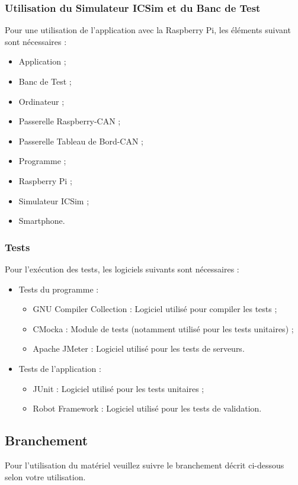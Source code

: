 \subsubsection{Utilisation du Simulateur ICSim et du Banc de Test}
Pour une utilisation de l'application {\nomApplication} avec la Raspberry Pi, les éléments suivant sont nécessaires :
\begin{itemize}
    \item Application {\nomApplication} ;
    \item Banc de Test ;
    \item Ordinateur ;
    \item Passerelle Raspberry-CAN ;
    \item Passerelle Tableau de Bord-CAN ;
    \item Programme {\nomLogiciel} ;
    \item Raspberry Pi ;
    \item Simulateur ICSim ;
    \item Smartphone.
\end{itemize}

\subsubsection{Tests}
Pour l'exécution des tests, les logiciels suivants sont nécessaires :
\begin{itemize}
    \item Tests du programme {\nomLogiciel} :
    \begin{itemize}
        \item GNU Compiler Collection : Logiciel utilisé pour compiler les tests ;
        \item CMocka : Module de tests (notamment utilisé pour les tests unitaires) ;
        \item Apache JMeter : Logiciel utilisé pour les tests de serveurs.
    \end{itemize}
    \item Tests de l'application {\nomApplication} :
    \begin{itemize}
        \item JUnit : Logiciel utilisé pour les tests unitaires ;
        \item Robot Framework : Logiciel utilisé pour les tests de validation.
    \end{itemize}
\end{itemize}

\subsection{Branchement}
Pour l'utilisation du matériel veuillez suivre le branchement décrit ci-dessous selon votre utilisation.

